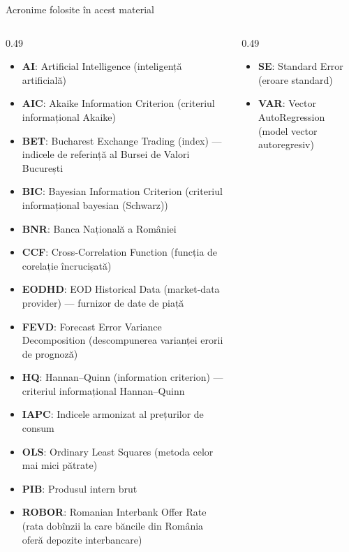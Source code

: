 {
\begin{frame}[noframenumbering]
    \titlepage
\end{frame}
}
\begin{frame}{Acronime folosite în acest material}
\begin{columns}[T]
\begin{column}{0.49\textwidth}
\begin{itemize}\setlength{\itemsep}{0pt}
    \item \textbf{AI}: Artificial Intelligence (inteligență artificială)
    \item \textbf{AIC}: Akaike Information Criterion (criteriul informațional Akaike)
    \item \textbf{BET}: Bucharest Exchange Trading (index) — indicele de referință al Bursei de Valori București
    \item \textbf{BIC}: Bayesian Information Criterion (criteriul informațional bayesian (Schwarz))
    \item \textbf{BNR}: Banca Națională a României
    \item \textbf{CCF}: Cross-Correlation Function (funcția de corelație încrucișată)
    \item \textbf{EODHD}: EOD Historical Data (market-data provider) — furnizor de date de piață
    \item \textbf{FEVD}: Forecast Error Variance Decomposition (descompunerea varianței erorii de prognoză)
    \item \textbf{HQ}: Hannan–Quinn (information criterion) — criteriul informațional Hannan–Quinn
    \item \textbf{IAPC}: Indicele armonizat al prețurilor de consum
    \item \textbf{OLS}: Ordinary Least Squares (metoda celor mai mici pătrate)
    \item \textbf{PIB}: Produsul intern brut
    \item \textbf{ROBOR}: Romanian Interbank Offer Rate (rata dobînzii la care băncile din România oferă depozite interbancare)
\end{itemize}
\end{column}
\begin{column}{0.49\textwidth}
\begin{itemize}\setlength{\itemsep}{0pt}
    \item \textbf{SE}: Standard Error (eroare standard)
    \item \textbf{VAR}: Vector AutoRegression (model vector autoregresiv)
\end{itemize}
\end{column}
\end{columns}
\end{frame}

